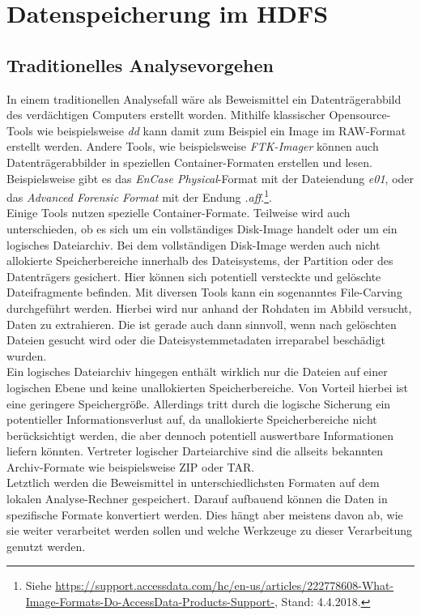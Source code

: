 \section{Datenspeicherung im HDFS}

\subsection{Traditionelles Analysevorgehen}
In einem traditionellen Analysefall wäre als Beweismittel ein Datenträgerabbild des verdächtigen Computers erstellt worden. Mithilfe klassischer Opensource-Tools wie beispielsweise \textit{dd} kann damit zum Beispiel ein Image im RAW-Format erstellt werden. Andere Tools, wie beispielsweise \textit{FTK-Imager} können auch Datenträgerabbilder in speziellen Container-Formaten erstellen und lesen. Beispielsweise gibt es das \textit{EnCase Physical}-Format mit der Dateiendung \textit{e01}, oder das \textit{Advanced Forensic Format} mit der Endung \textit{.aff}.\footnote{Siehe \url{https://support.accessdata.com/hc/en-us/articles/222778608-What-Image-Formats-Do-AccessData-Products-Support-}, Stand: 4.4.2018.}.\\

\noindent
Einige Tools nutzen spezielle Container-Formate. Teilweise wird auch unterschieden, ob es sich um ein vollständiges Disk-Image handelt oder um ein logisches Dateiarchiv. Bei dem vollständigen Disk-Image werden auch nicht allokierte Speicherbereiche innerhalb des Dateisystems, der Partition oder des Datenträgers gesichert. Hier können sich potentiell versteckte und gelöschte Dateifragmente befinden. Mit diversen Tools kann ein sogenanntes File-Carving durchgeführt werden. Hierbei wird nur anhand der Rohdaten im Abbild versucht, Daten zu extrahieren. Die ist gerade auch dann sinnvoll, wenn nach gelöschten Dateien gesucht wird oder die Dateisystemmetadaten irreparabel beschädigt wurden.
\\ Ein logisches Dateiarchiv hingegen enthält wirklich nur die Dateien auf einer logischen Ebene und keine unallokierten Speicherbereiche. Von Vorteil hierbei ist eine geringere Speichergröße. Allerdings tritt durch die logische Sicherung ein potentieller Informationsverlust auf, da unallokierte Speicherbereiche nicht berücksichtigt werden, die aber dennoch potentiell auswertbare Informationen liefern könnten. Vertreter logischer Darteiarchive sind die allseits bekannten Archiv-Formate wie beispielsweise ZIP oder TAR.\\

\noindent
Letztlich werden die Beweismittel in unterschiedlichsten Formaten auf dem lokalen Analyse-Rechner gespeichert. Darauf aufbauend können die Daten in spezifische Formate konvertiert werden. Dies hängt aber meistens davon ab, wie sie weiter verarbeitet werden sollen und welche Werkzeuge zu dieser Verarbeitung genutzt werden.\\


